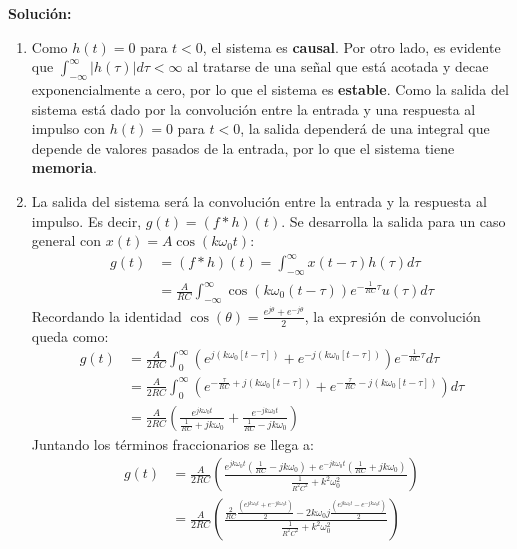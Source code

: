 \documentclass[letterpaper, 12pt]{article}
\newif\ifanswers
\begin{document}
\begin{enumerate}
    \ifanswers
    {\color{red}
    \textbf{Solución:}
    \begin{enumerate}
        \item Como $h(t) = 0$ para $t<0$, el sistema es \textbf{causal}. Por otro lado, es evidente que $\int_{-\infty}^{\infty} |h(\tau)| d\tau < \infty$ al tratarse de una señal que está acotada y decae exponencialmente a cero, por lo que el sistema es \textbf{estable}. Como la salida del sistema está dado por la convolución entre la entrada y una respuesta al impulso con $h(t)=0$ para $t<0$, la salida dependerá de una integral que depende de valores pasados de la entrada, por lo que el sistema tiene \textbf{memoria}.
        \item La salida del sistema será la convolución entre la entrada y la respuesta al impulso. Es decir, $g(t)=(f*h)(t)$. Se desarrolla la salida para un caso general con $x(t)=A\cos(k\omega_0 t)$:
        \begin{align*}
            g(t) &= (f*h)(t) = \int_{-\infty}^{\infty} x(t-\tau)h(\tau)d\tau \\
            &= \frac{A}{RC}\int_{-\infty}^{\infty} \cos(k\omega_0(t-\tau))e^{-\frac{1}{RC}\tau} u(\tau) d\tau
        \end{align*}
        Recordando la identidad $\cos(\theta)=\frac{e^{j\theta} + e^{-j\theta}}{2}$, la expresión de convolución queda como:
        \begin{align*}
            g(t) &= \frac{A}{2RC} \int_{0}^{\infty} (e^{j(k\omega_0[t-\tau])}+e^{-j(k\omega_0[t-\tau])})e^{-\frac{1}{RC}\tau}d\tau \\
            &= \frac{A}{2RC} \int_{0}^{\infty} (e^{-\frac{\tau}{RC}+j(k\omega_0[t-\tau])}+e^{-\frac{\tau}{RC}-j(k\omega_0[t-\tau])})d\tau \\
            &= \frac{A}{2RC}\left(\frac{e^{jk\omega_0 t}}{\frac{1}{RC}+jk\omega_0} + \frac{e^{-jk\omega_0 t}}{\frac{1}{RC}-jk\omega_0} \right)
        \end{align*}
        Juntando los términos fraccionarios se llega a:
        \begin{align*}
            g(t) &= \frac{A}{2RC}\left( \frac{e^{j k\omega_0 t} \left( \frac{1}{RC}-jk\omega_0\right)+e^{-j k\omega_0 t} \left( \frac{1}{RC}+jk\omega_0\right)}{\frac{1}{R^2C^2}+k^2\omega_0^{2}} \right) \\
            &= \frac{A}{2RC}\left( \frac{\frac{2}{RC}\frac{(e^{jk\omega_0t}+e^{-jk\omega_0 t})}{2}-2k\omega_0 j\frac{(e^{jk\omega_0t}-e^{-jk\omega_0 t})}{2}}{\frac{1}{R^2C^2}+k^2\omega_0^{2}} \right) \\

\end{align*}
\end{enumerate}}
\end{enumerate}
\end{document}
